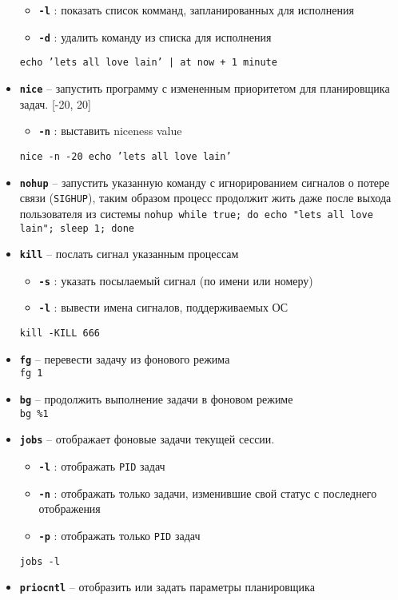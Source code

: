 \documentclass[12pt, a4paper]{article}
\begin{document}
\begin{itemize}
\begin{itemize}
      \item \textbf{\texttt{-l}} : показать список комманд, запланированных для
        исполнения
      \item \textbf{\texttt{-d}} : удалить команду из списка для исполнения
    \end{itemize}
    \texttt{echo 'lets all love lain' | at now + 1 minute}
  \item \textbf{\texttt{nice}} -- запустить программу с измененным приоритетом
    для планировщика задач. [-20, 20]
    \begin{itemize}
      \item \textbf{\texttt{-n}} : выставить niceness value
    \end{itemize}
    \texttt{nice -n -20 echo 'lets all love lain'}
  \item \textbf{\texttt{nohup}} -- запустить указанную команду с игнорированием
    сигналов о потере связи (\texttt{SIGHUP}), таким образом процесс продолжит
    жить даже после выхода пользователя из системы
    \texttt{nohup while true; do echo "lets all love lain"; sleep 1; done}
  \item \textbf{\texttt{kill}} -- послать сигнал указанным процессам
    \begin{itemize}
      \item \textbf{\texttt{-s}} : указать посылаемый сигнал (по имени или номеру)
      \item \textbf{\texttt{-l}} : вывести имена сигналов, поддерживаемых ОС
    \end{itemize}
    \texttt{kill -KILL 666}
  \item \textbf{\texttt{fg}} -- перевести задачу из фонового режима\\
    \texttt{fg 1}
  \item \textbf{\texttt{bg}} -- продолжить выполнение задачи в фоновом режиме\\
    \texttt{bg \%1}
  \item \textbf{\texttt{jobs}} -- отображает фоновые задачи текущей сессии.
    \begin{itemize}
      \item \textbf{\texttt{-l}} : отображать \texttt{PID} задач
      \item \textbf{\texttt{-n}} : отображать только задачи, изменившие свой
        статус с последнего отображения
      \item \textbf{\texttt{-p}} : отображать только \texttt{PID} задач
    \end{itemize}
    \texttt{jobs -l}
  \item \textbf{\texttt{priocntl}} -- отобразить или задать параметры планировщика

\end{itemize}
\end{document}
